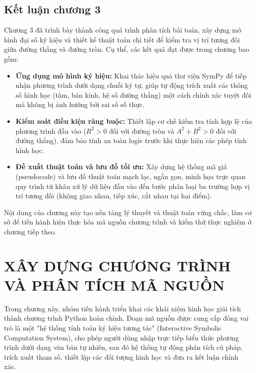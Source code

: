 \documentclass[12pt,a4paper]{article}
\begin{document}
\subsection{ Kết luận chương 3}

Chương 3 đã trình bày thành công quá trình phân tích bài toán, xây dựng mô hình đại số ký hiệu và thiết kế thuật toán chi tiết để kiểm tra vị trí tương đối giữa đường thẳng và đường tròn. Cụ thể, các kết quả đạt được trong chương bao gồm:
\begin{itemize}[leftmargin=*]
    \item \textbf{Ứng dụng mô hình ký hiệu:} Khai thác hiệu quả thư viện SymPy để tiếp nhận phương trình dưới dạng chuỗi ký tự, giúp tự động trích xuất các thông số hình học (tâm, bán kính, hệ số đường thẳng) một cách chính xác tuyệt đối mà không bị ảnh hưởng bởi sai số số thực.
    \item \textbf{Kiểm soát điều kiện ràng buộc:} Thiết lập cơ chế kiểm tra tính hợp lệ của phương trình đầu vào ($R^2 > 0$ đối với đường tròn và $A^2 + B^2 > 0$ đối với đường thẳng), đảm bảo tính an toàn logic trước khi thực hiện các phép tính hình học.
    \item \textbf{Đề xuất thuật toán và lưu đồ tối ưu:} Xây dựng hệ thống mã giả (pseudocode) và lưu đồ thuật toán mạch lạc, ngắn gọn, minh họa trực quan quy trình từ khâu xử lý dữ liệu đầu vào đến bước phân loại ba trường hợp vị trí tương đối (không giao nhau, tiếp xúc, cắt nhau tại hai điểm).
\end{itemize}
Nội dung của chương này tạo nền tảng lý thuyết và thuật toán vững chắc, làm cơ sở để tiến hành hiện thực hóa mã nguồn chương trình và kiểm thử thực nghiệm ở chương tiếp theo.

\newpage
\section{ XÂY DỰNG CHƯƠNG TRÌNH VÀ PHÂN TÍCH MÃ NGUỒN}

Trong chương này, nhóm tiến hành triển khai các khái niệm hình học giải tích thành chương trình Python hoàn chỉnh. Đoạn mã nguồn được cung cấp đóng vai trò là một "hệ thống tính toán ký hiệu tương tác" (Interactive Symbolic Computation System), cho phép người dùng nhập trực tiếp biểu thức phương trình dưới dạng văn bản tự nhiên, sau đó hệ thống tự động phân tích cú pháp, trích xuất tham số, thiết lập các đối tượng hình học và đưa ra kết luận chính xác.
\end{document}
